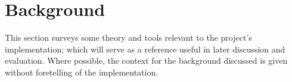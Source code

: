 \section{Background} \label{bg}

This section surveys some theory and tools relevant to the project's implementation; which will serve as a reference useful in later discussion and evaluation. Where possible, the context for the background discussed is given without foretelling of the implementation.





